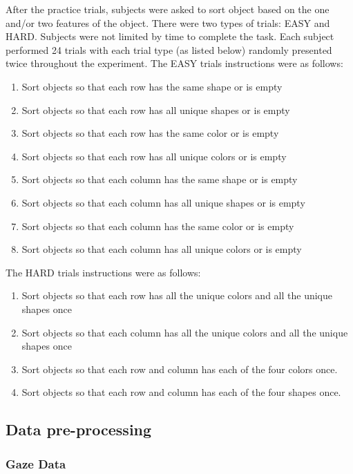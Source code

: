 After the practice trials, subjects were asked to sort object based on the one and/or two features of the object. There were two types of trials: EASY and HARD. Subjects were not limited by time to complete the task. Each subject performed 24 trials with each trial type (as listed below) randomly presented twice throughout the experiment. 
The EASY trials instructions were as follows:
\begin{enumerate}
    \item Sort objects so that each row has the same shape or is empty
    \item Sort objects so that each row has all unique shapes or is empty
    \item Sort objects so that each row has the same color or is empty
    \item Sort objects so that each row has all unique colors or is empty
    \item Sort objects so that each column has the same shape or is empty
    \item Sort objects so that each column has all unique shapes or is empty
    \item Sort objects so that each column has the same color or is empty
    \item Sort objects so that each column has all unique colors or is empty
\end{enumerate}
The HARD trials instructions were as follows:
\begin{enumerate}
    \item Sort objects so that each row has all the unique colors and all the unique shapes once
    \item Sort objects so that each column has all the unique colors and all the unique  shapes once
    \item Sort objects so that each row and column has each of the four colors once. 
    \item Sort objects so that each row and column has each of the four shapes once. 
\end{enumerate}



\subsection{Data pre-processing}

\subsubsection{Gaze Data}

